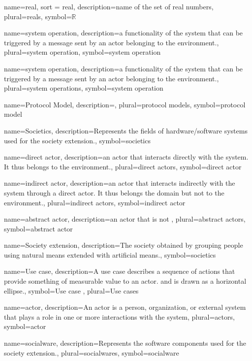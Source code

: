 

\DeclareRobustCommand{\glsict}{{information and communication technological}~}

{name={real},
sort = real,
description={name of the set of real numbers},
plural={reals},
symbol={\ensuremath{\mathbb{R}}}
}

{name={system operation},
description={a functionality of the system that can be triggered by a message sent by an actor belonging to the environment.},
plural={system operation},
symbol=system operation
}

{name=system operation,
description={a functionality of the system that can be triggered by a message sent by an actor belonging to the environment.},
plural={system operations},
symbol=system operation
}

{name=Protocol Model,
description={},
plural={protocol models},
symbol=protocol model
}

{name=Societics,
description={Represents the fields of hardware/software
systems used for the society extension.},
symbol=societics
}

{name=direct actor,
description={an actor that interacts directly with the system. It thus belongs to the environment.},
plural={direct actors},
symbol=direct actor
}

{name=indirect actor,
description={an actor that interacts indirectly with the system through a direct actor. It thus belongs the domain but not to the environment.},
plural=indirect actors,
symbol=indirect actor
}

{name=abstract actor,
description={an actor that is not },
plural=abstract actors,
symbol=abstract actor
}

{name=Society extension,
description={The society obtained by grouping people using natural means
extended with artificial means.},
symbol=societics
}

{name=Use case,
description={A use case describes a sequence of actions that provide something
of measurable value to an actor. and is drawn as a horizontal ellipse.},
symbol=Use case ,
plural=Use cases
}

{name=actor,
description={An actor is a person, organization, or external system that plays a role in one or more interactions with the system},
plural={actors},
symbol=actor
}

{name={socialware},
description={Represents the software 
components used for the society extension.},
plural={socialwares},
symbol=socialware
}


